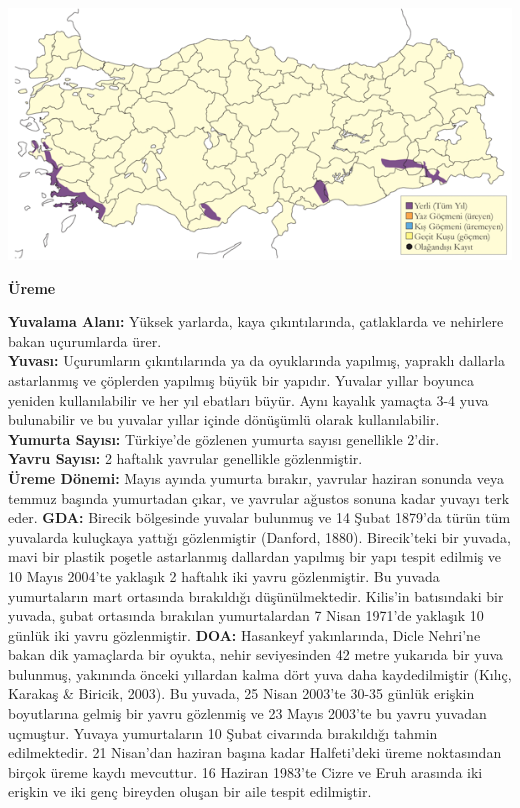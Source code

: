 \documentclass[
  a4paper,
  DIV=11,
  numbers=noendperiod]{scrreprt}
\begin{document}
\includegraphics{images/harita_Page_097.png}

\textbf{Üreme}

\textbf{Yuvalama Alanı:} Yüksek yarlarda, kaya çıkıntılarında,
çatlaklarda ve nehirlere bakan uçurumlarda ürer.\\
\textbf{Yuvası:} Uçurumların çıkıntılarında ya da oyuklarında yapılmış,
yapraklı dallarla astarlanmış ve çöplerden yapılmış büyük bir yapıdır.
Yuvalar yıllar boyunca yeniden kullanılabilir ve her yıl ebatları büyür.
Aynı kayalık yamaçta 3-4 yuva bulunabilir ve bu yuvalar yıllar içinde
dönüşümlü olarak kullanılabilir.\\
\textbf{Yumurta Sayısı:} Türkiye'de gözlenen yumurta sayısı genellikle
2'dir.\\
\textbf{Yavru Sayısı:} 2 haftalık yavrular genellikle gözlenmiştir.\\
\textbf{Üreme Dönemi:} Mayıs ayında yumurta bırakır, yavrular haziran
sonunda veya temmuz başında yumurtadan çıkar, ve yavrular ağustos sonuna
kadar yuvayı terk eder. \textbf{GDA:} Birecik bölgesinde yuvalar
bulunmuş ve 14 Şubat 1879'da türün tüm yuvalarda kuluçkaya yattığı
gözlenmiştir (Danford, 1880). Birecik'teki bir yuvada, mavi bir plastik
poşetle astarlanmış dallardan yapılmış bir yapı tespit edilmiş ve 10
Mayıs 2004'te yaklaşık 2 haftalık iki yavru gözlenmiştir. Bu yuvada
yumurtaların mart ortasında bırakıldığı düşünülmektedir. Kilis'in
batısındaki bir yuvada, şubat ortasında bırakılan yumurtalardan 7 Nisan
1971'de yaklaşık 10 günlük iki yavru gözlenmiştir. \textbf{DOA:}
Hasankeyf yakınlarında, Dicle Nehri'ne bakan dik yamaçlarda bir oyukta,
nehir seviyesinden 42 metre yukarıda bir yuva bulunmuş, yakınında önceki
yıllardan kalma dört yuva daha kaydedilmiştir (Kılıç, Karakaş \&
Biricik, 2003). Bu yuvada, 25 Nisan 2003'te 30-35 günlük erişkin
boyutlarına gelmiş bir yavru gözlenmiş ve 23 Mayıs 2003'te bu yavru
yuvadan uçmuştur. Yuvaya yumurtaların 10 Şubat civarında bırakıldığı
tahmin edilmektedir. 21 Nisan'dan haziran başına kadar Halfeti'deki
üreme noktasından birçok üreme kaydı mevcuttur. 16 Haziran 1983'te Cizre
ve Eruh arasında iki erişkin ve iki genç bireyden oluşan bir aile tespit
edilmiştir.
\end{document}
